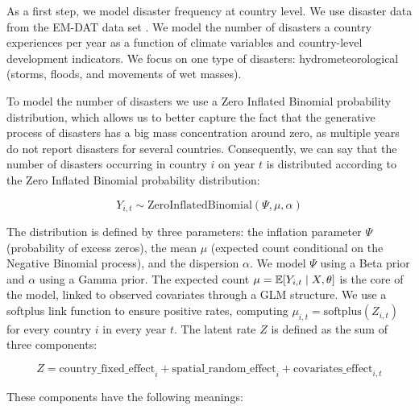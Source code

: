 As a first step, we model disaster frequency at country level. We use disaster data from the EM-DAT data set \citep{cred_emdat_2024}. We model the number of disasters a country experiences per year as a function of climate variables and country-level development indicators. We focus on one type of disasters: hydrometeorological (storms, floods, and movements of wet masses).

To model the number of disasters we use a Zero Inflated Binomial probability distribution, which allows us to better capture the fact that the generative process of disasters has a big mass concentration around zero, as multiple years do not report disasters for several countries. Consequently, we can say that the number of disasters occurring in country $i$ on year $t$ is distributed according to the Zero Inflated Binomial probability distribution:

\begin{equation}
Y_{i,t} \sim \text{ZeroInflatedBinomial}(\Psi, \mu, \alpha)
\end{equation}

The distribution is defined by three parameters: the inflation parameter $\Psi$ (probability of excess zeros), the mean $\mu$ (expected count conditional on the Negative Binomial process), and the dispersion $\alpha$. We model $\Psi$ using a Beta prior and $\alpha$ using a Gamma prior. The expected count $\mu = \mathbb{E}[Y_{i,t} \mid X, \theta]$ is the core of the model, linked to observed covariates through a GLM structure. We use a softplus link function to ensure positive rates, computing $\mu_{i,t} = \text{softplus}(Z_{i,t})$ for every country $i$ in every year $t$. The latent rate $Z$ is defined as the sum of three components:

\begin{equation}
Z = \text{country\_fixed\_effect}_{i} + \text{spatial\_random\_effect}_{i} + \text{covariates\_effect}_{i,t}
\end{equation}

These components have the following meanings:

